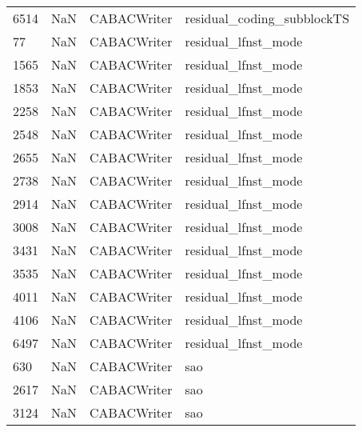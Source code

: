 \begin{tabular}{llll}
6514 &                   NaN &                CABACWriter &                residual\_coding\_subblockTS \\
77   &                   NaN &                CABACWriter &                       residual\_lfnst\_mode \\
1565 &                   NaN &                CABACWriter &                       residual\_lfnst\_mode \\
1853 &                   NaN &                CABACWriter &                       residual\_lfnst\_mode \\
2258 &                   NaN &                CABACWriter &                       residual\_lfnst\_mode \\
2548 &                   NaN &                CABACWriter &                       residual\_lfnst\_mode \\
2655 &                   NaN &                CABACWriter &                       residual\_lfnst\_mode \\
2738 &                   NaN &                CABACWriter &                       residual\_lfnst\_mode \\
2914 &                   NaN &                CABACWriter &                       residual\_lfnst\_mode \\
3008 &                   NaN &                CABACWriter &                       residual\_lfnst\_mode \\
3431 &                   NaN &                CABACWriter &                       residual\_lfnst\_mode \\
3535 &                   NaN &                CABACWriter &                       residual\_lfnst\_mode \\
4011 &                   NaN &                CABACWriter &                       residual\_lfnst\_mode \\
4106 &                   NaN &                CABACWriter &                       residual\_lfnst\_mode \\
6497 &                   NaN &                CABACWriter &                       residual\_lfnst\_mode \\
630  &                   NaN &                CABACWriter &                                       sao \\
2617 &                   NaN &                CABACWriter &                                       sao \\
3124 &                   NaN &                CABACWriter &                                       sao \\

\end{tabular}
